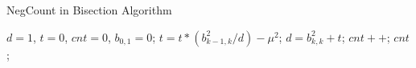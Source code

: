 \begin{algorithm}[h]
\caption{NegCount in Bisection Algorithm}
\label{alg:negcount}
\begin{algorithmic}[1]
  \State $d=1$, $t=0$, $cnt=0$, $b_{0,1}=0$;
    \State $t = t * (b_{k-1,k}^2 / d) - \mu^2$;
    \State $d = b_{k,k}^2 + t$;
      \State $cnt++$;
    \EndIf
  \EndFor
  \State \Return $cnt$;
\EndProcedure
\end{algorithmic}
\end{algorithm}
